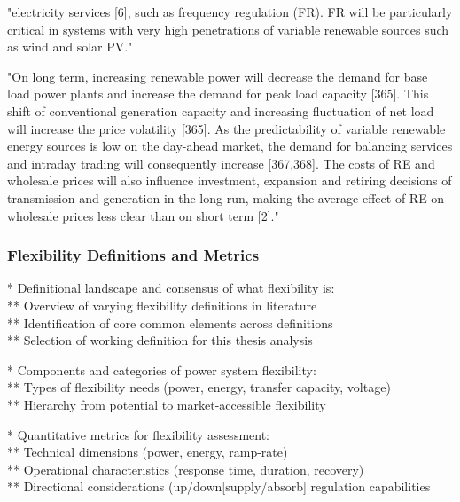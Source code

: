 "electricity services [6], such as frequency regulation (FR). FR will be particularly critical in systems with very high penetrations of variable renewable sources such as wind and solar PV." \cite{aunedi_whole-system_2020}

"On long term, increasing renewable power will decrease the demand for base load power plants and increase the demand for peak load capacity [365]. This shift of conventional generation capacity and increasing fluctuation of net load will increase the price volatility [365]. As the predictability of variable renewable energy sources is low on the day-ahead market, the demand for balancing services and intraday trading will consequently increase [367,368]. The costs of RE and wholesale prices will also influence investment, expansion and retiring decisions of transmission and generation in the long run, making the average effect of RE on wholesale prices less clear than on short term [2]." \cite{lund_review_2015}


\subsubsection{Flexibility Definitions and Metrics}

* Definitional landscape and consensus of what flexibility is: \\
** Overview of varying flexibility definitions in literature \\
** Identification of core common elements across definitions \\
** Selection of working definition for this thesis analysis

* Components and categories of power system flexibility: \\
** Types of flexibility needs (power, energy, transfer capacity, voltage) \\
** Hierarchy from potential to market-accessible flexibility 

* Quantitative metrics for flexibility assessment: \\
** Technical dimensions (power, energy, ramp-rate) \\
** Operational characteristics (response time, duration, recovery) \\
** Directional considerations (up/down[supply/absorb] regulation capabilities



